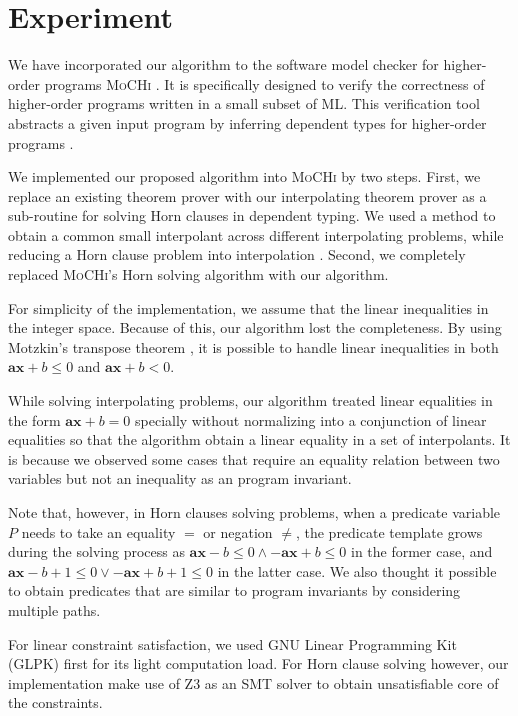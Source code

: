\chapter{Experiment}
\label{chap:experiment}

We have incorporated our algorithm to the software model checker for
higher-order programs \textsc{MoCHi} \cite{conf/pldi/KobayashiSU11}.  It is
specifically designed to verify the correctness of higher-order
programs written in a small subset of ML.  This verification tool
abstracts a given input program by inferring dependent types for
higher-order programs \cite{conf/ppdp/UnnoK09}.

We implemented our proposed algorithm into \textsc{MoCHi} by two steps.  First,
we replace an existing theorem prover with our interpolating theorem
prover as a sub-routine for solving Horn clauses in dependent typing.
We used a method to obtain a common small interpolant across different
interpolating problems, while reducing a Horn clause problem into
interpolation \cite{conf/ppdp/UnnoK09}.  Second, we completely
replaced \textsc{MoCHi}'s Horn solving algorithm with our algorithm.

For simplicity of the implementation, we assume that the linear
inequalities in the integer space.  Because of this, our algorithm
lost the completeness.  By using Motzkin's transpose theorem
\cite{journals/networks/Rajan90}, it is possible to handle linear
inequalities in both $\mathbf{ax} + b \leq 0$ and $\mathbf{ax} + b <
0$.

While solving interpolating problems, our algorithm treated linear
equalities in the form $\mathbf{ax} + b = 0$ specially without
normalizing into a conjunction of linear equalities so that the
algorithm obtain a linear equality in a set of interpolants.  It is
because we observed some cases that require an equality relation
between two variables but not an inequality as an program invariant.

Note that, however, in Horn clauses solving problems, when a predicate
variable $P$ needs to take an equality $=$ or negation $\neq$, the
predicate template grows during the solving process as
$\mathbf{ax}-b \leq 0 \wedge -\mathbf{ax}+b \leq 0$ in the former
case, and $\mathbf{ax}-b+1 \leq 0 \vee -\mathbf{ax}+b+1 \leq 0$ in the
latter case.  We also thought it possible to obtain predicates that
are similar to program invariants by considering multiple paths.

For linear constraint satisfaction, we used GNU Linear Programming Kit
(GLPK) first for its light computation load.  For Horn clause solving
however, our implementation make use of Z3 \cite{conf/tacas/MouraB08}
as an SMT solver to obtain unsatisfiable core of the constraints.

